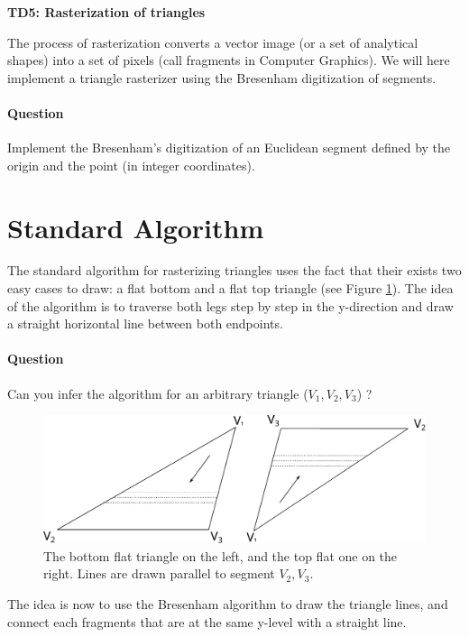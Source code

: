 \documentclass[a4paper, 11pt]{article}
\title{}
\author{}
\date{}
\begin{document}
\begin{center}
	\LARGE \textbf{TD5: Rasterization of triangles}
\end{center}

\bigskip
\par The process of rasterization converts a vector image (or a set of analytical shapes) into a set of pixels (call fragments in Computer Graphics).
We will here implement a triangle rasterizer using the Bresenham digitization of segments.

\paragraph{Question} Implement the Bresenham's digitization of an Euclidean segment defined by the origin and the point (in integer coordinates).

\section*{Standard Algorithm}

The standard algorithm for rasterizing triangles uses the fact that their exists two easy cases to draw: a flat bottom and a flat top triangle (see Figure \ref{fig:triangles}).
The idea of the algorithm is to traverse both legs step by step in the y-direction and draw a straight horizontal line between both endpoints.

\paragraph{Question} Can you infer the algorithm for an arbitrary triangle ($V_1,V_2,V_3$) ?

\begin{figure}
  \centering
  \includegraphics[width=\textwidth]{triangles}
  \caption{The bottom flat triangle on the left, and the top flat one on the right. Lines are drawn parallel to segment $V_2,V_3$.}
  \label{fig:triangles}
\end{figure}

\vspace{5mm}
\noindent The idea is now to use the Bresenham algorithm to draw the triangle lines, and connect each fragments that are at the same y-level with a straight line.
\end{document}
